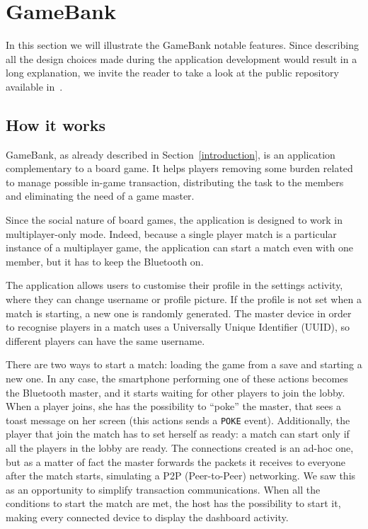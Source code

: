 \section{GameBank}
\label{game_bank}

In this section we will illustrate the GameBank notable features. Since 
describing all the design choices made during the application development would 
result in a long explanation, we invite the reader to take a look at the public 
repository available in~\cite{gamebank18}.

\subsection{How it works}

GameBank, as already described in Section~\ref{introduction}, is an application 
complementary to a board game. It helps players removing some burden related to 
manage possible in-game transaction, distributing the task to the members and 
eliminating the need of a game master.

Since the social nature of board games, the application is designed to work 
in multiplayer-only mode. Indeed, because a single player match is a particular 
instance of a multiplayer game, the application can start a match even with one 
member, but it has to keep the Bluetooth on.

The application allows users to customise their profile in the settings 
activity, where they can change username or profile picture. If the profile is 
not set when a match is starting, a new one is randomly generated. The master 
device in order to recognise players in a match uses a Universally Unique 
Identifier (UUID), so different players can have the same username.

There are two ways to start a match: loading the game from a save and starting 
a new one. In any case, the smartphone performing one of these actions becomes 
the Bluetooth master, and it starts waiting for other players to join the 
lobby. When a player joins, she has the possibility to ``poke'' the master, 
that sees a toast message on her screen (this actions sends a \texttt{POKE} 
event). Additionally, the player that join the match has to set herself as 
ready: a match can start only if all the players in the lobby are ready. 
The connections created is an ad-hoc one, but as a matter of fact the master 
forwards the packets it receives to everyone after the match starts, simulating 
a P2P (Peer-to-Peer) networking. We saw this as an opportunity to simplify 
transaction communications.
When all the conditions to start the match are met, the host has the 
possibility to start it, making every connected device to display the dashboard 
activity.

